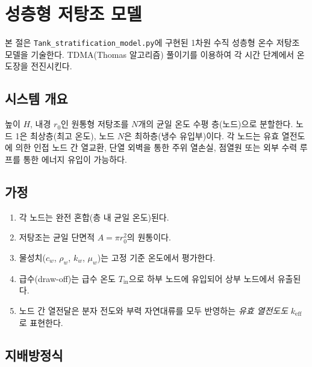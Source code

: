 \section{성층형 저탕조 모델}
\label{sec:tank-stratification}

본 절은 \texttt{Tank\_stratification\_model.py}에 구현된 1차원 수직 성층형 온수 저탕조 모델을 기술한다. TDMA(Thomas 알고리즘) 풀이기를 이용하여 각 시간 단계에서 온도장을 전진시킨다.

\subsection{시스템 개요}

높이 $H$, 내경 $r_0$인 원통형 저탕조를 $N$개의 균일 온도 수평 층(노드)으로 분할한다. 노드 1은 최상층(최고 온도), 노드 $N$은 최하층(냉수 유입부)이다. 각 노드는 유효 열전도에 의한 인접 노드 간 열교환, 단열 외벽을 통한 주위 열손실, 점열원 또는 외부 수력 루프를 통한 에너지 유입이 가능하다.

\subsection{가정}
\label{sec:tank-assumptions}

\begin{enumerate}
  \item 각 노드는 완전 혼합(층 내 균일 온도)된다.
  \item 저탕조는 균일 단면적 $A = \pi r_0^2$의 원통이다.
  \item 물성치($c_w$, $\rho_w$, $k_w$, $\mu_w$)는 고정 기준 온도에서 평가한다.
  \item 급수(draw-off)는 급수 온도 $T_\text{in}$으로 하부 노드에 유입되어 상부 노드에서 유출된다.
  \item 노드 간 열전달은 분자 전도와 부력 자연대류를 모두 반영하는 \emph{유효 열전도도} $k_\text{eff}$로 표현한다.
\end{enumerate}

\subsection{지배방정식}


